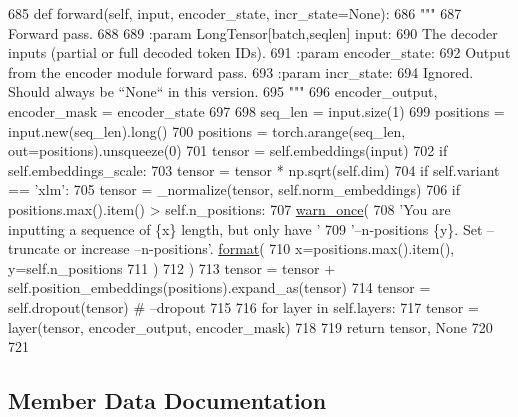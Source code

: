\begin{DoxyCode}
685     \textcolor{keyword}{def }forward(self, input, encoder\_state, incr\_state=None):
686         \textcolor{stringliteral}{"""}
687 \textcolor{stringliteral}{        Forward pass.}
688 \textcolor{stringliteral}{}
689 \textcolor{stringliteral}{        :param LongTensor[batch,seqlen] input:}
690 \textcolor{stringliteral}{            The decoder inputs (partial or full decoded token IDs).}
691 \textcolor{stringliteral}{        :param encoder\_state:}
692 \textcolor{stringliteral}{            Output from the encoder module forward pass.}
693 \textcolor{stringliteral}{        :param incr\_state:}
694 \textcolor{stringliteral}{            Ignored. Should always be ``None`` in this version.}
695 \textcolor{stringliteral}{        """}
696         encoder\_output, encoder\_mask = encoder\_state
697 
698         seq\_len = input.size(1)
699         positions = input.new(seq\_len).long()
700         positions = torch.arange(seq\_len, out=positions).unsqueeze(0)
701         tensor = self.embeddings(input)
702         \textcolor{keywordflow}{if} self.embeddings\_scale:
703             tensor = tensor * np.sqrt(self.dim)
704         \textcolor{keywordflow}{if} self.variant == \textcolor{stringliteral}{'xlm'}:
705             tensor = \_normalize(tensor, self.norm\_embeddings)
706         \textcolor{keywordflow}{if} positions.max().item() > self.n\_positions:
707             \hyperlink{namespaceparlai_1_1utils_1_1misc_acf146e70ea7f6867969a7c2b545d4b4b}{warn\_once}(
708                 \textcolor{stringliteral}{'You are inputting a sequence of \{x\} length, but only have '}
709                 \textcolor{stringliteral}{'--n-positions \{y\}. Set --truncate or increase --n-positions'}.
      \hyperlink{namespaceparlai_1_1chat__service_1_1services_1_1messenger_1_1shared__utils_a32e2e2022b824fbaf80c747160b52a76}{format}(
710                     x=positions.max().item(), y=self.n\_positions
711                 )
712             )
713         tensor = tensor + self.position\_embeddings(positions).expand\_as(tensor)
714         tensor = self.dropout(tensor)  \textcolor{comment}{# --dropout}
715 
716         \textcolor{keywordflow}{for} layer \textcolor{keywordflow}{in} self.layers:
717             tensor = layer(tensor, encoder\_output, encoder\_mask)
718 
719         \textcolor{keywordflow}{return} tensor, \textcolor{keywordtype}{None}
720 
721 
\end{DoxyCode}


\subsection{Member Data Documentation}
\mbox{\label{classparlai_1_1agents_1_1transformer_1_1modules_1_1TransformerDecoder_aced85fffc20320f29be295f94e686a63}} 
